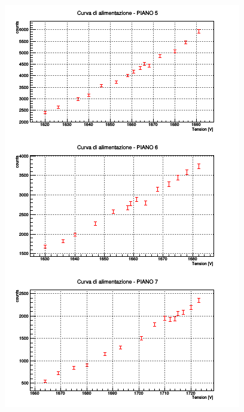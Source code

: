 \documentclass[11pt]{article}
\begin{document}
\begin{flushleft}
\begin{figure}
\includegraphics{"plateau_2"}
\end{figure}


\end{flushleft}
\end{document}
